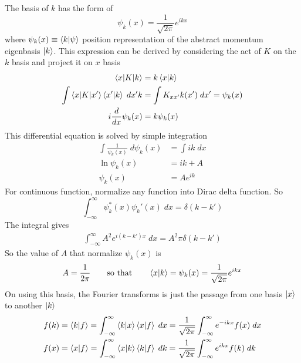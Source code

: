 \documentclass[../../../main.tex]{subfiles}
\begin{document}
The basis of $k$ has the form of
\begin{equation*}
	\psi_k(x)=\frac{1 }{\sqrt{2\pi}}e^{ikx}
\end{equation*}
where $\psi_k(x)\equiv \braket{k|\psi}$ position representation of the abstract momentum eigenbasis $\ket{k}$.
This expression can be derived by considering the act of $K$ on the $k$ basis and project it on $x$ basis
\begin{align*}
	\braket{x|K|k}                          & =k\braket{x|k}                    \\
	\int \braket{x|K|x'}\braket{x'|k}\;dx'k & =\int K_{xx'}k(x')\;dx'=\psi_k(x) \\
	i\frac{d }{dx }\psi_k(x )               & =k \psi_k(x)                      \\
\end{align*}
This differential equation is solved by simple integration
\begin{align*}
	\int \frac{1 }{\psi_k(x)}\;d\psi_k(x) & =\int ik\;dx \\
	\ln \psi_k(x)                         & =ik+A        \\
	\psi_k(x)                             & =Ae^{ik}
\end{align*}
For continuous function, normalize any function into Dirac delta function.
So
\begin{equation*}
	\int_{-\infty}^{\infty} \psi_k ^*(x) \psi_k' (x)\;dx=\delta(k-k')
\end{equation*}
The integral gives
\begin{align*}
	\int_{-\infty}^{\infty} A^2e^{i(k-k')x}\;dx=A^2\pi \delta(k-k')
\end{align*}
So the value of $A$ that normalize $\psi_k(x)$ is
\begin{equation*}
	A=\frac{1 }{2\pi}\qquad\text{so that}\qquad \braket{x|k}=\psi_k(x)=\frac{1 }{\sqrt{2\pi}}e^{ikx}
\end{equation*}
On using this basis, the Fourier transforms is just the passage from one basis $\ket{x}$ to another $\ket{k}$
\begin{align*}
	f(k) & =\braket{k|f}=\int_{-\infty}^{\infty} \braket{k|x}\braket{x|f}\;dx=\frac{1 }{\sqrt{2\pi}}\int_{-\infty}^{\infty} e^{-ikx} f(x)\;dx \\
	f(x) & =\braket{x|f}=\int_{-\infty}^{\infty} \braket{x|k}\braket{k|f}\;dk=\frac{1 }{\sqrt{2\pi}}\int_{-\infty}^{\infty} e^{ikx} f(k)\;dk  \\
\end{align*}
\end{document}

